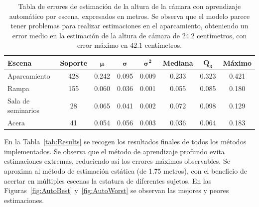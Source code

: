 \begin{table}[!ht]
  \centering
  \scriptsize
\begin{tabular}{|l|c|c|c|c|c|c|c|}
\hline
\rowcolor[HTML]{FFCB2F}
\textbf{Escena} & \textbf{Soporte} & $\bm{\mu}$ & $\bm{\sigma}$ & $\bm{\sigma^2}$ & \textbf{Mediana} & $\bm{Q_3}$ & \textbf{Máximo} \\
\hline
Aparcamiento & 428 & 0.242 & 0.095 & 0.009 &0.233 & 0.323 & 0.421 \\
\hline
Rampa & 155 & 0.060 & 0.036 & 0.001 &0.055 & 0.085 & 0.180 \\
\hline
Sala de seminarios & 28 & 0.065 & 0.041 & 0.002 &0.072 & 0.098 & 0.129 \\
\hline
Acera & 41 & 0.054 & 0.056 & 0.003 &0.036 & 0.064 & 0.183 \\
\hline
\end{tabular}
\caption[Tabla de errores de estimación de la altura de la cámara con aprendizaje automático por escena, expresados en metros.]{
Tabla de errores de estimación de la altura de la cámara con aprendizaje automático por escena, expresados en metros.
Se observa que el modelo parece tener problemas para realizar estimaciones en el aparcamiento,
obteniendo un error medio en la estimación de la altura de cámara de 24.2 centímetros, con error máximo en 42.1 centímetros.
}\label{tab:AutoCamResultsByScene}
\end{table}

En la Tabla~\ref{tab:Results} se recogen los resultados finales
de todos los métodos implementados.
Se observa que el método de aprendizaje profundo evita estimaciones extremas, reduciendo así
los errores máximos observables. Se aproxima al método de estimación estática (de 1.75 metros), con el beneficio de acertar en múltiples escenas
la estatura de diferentes sujetos. En las Figuras~\ref{fig:AutoBest} y~\ref{fig:AutoWorst} se
observan las mejores y peores estimaciones.

